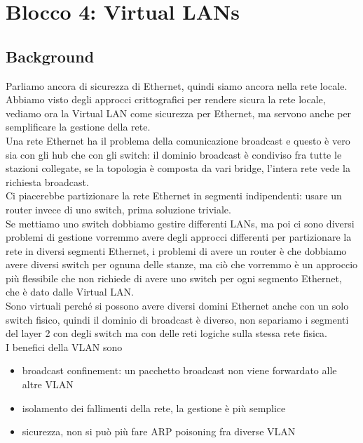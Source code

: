 \documentclass[12pt, oneside]{extbook} %
\begin{document}
\chapter*{Blocco 4: Virtual LANs}

\section{Background}
Parliamo ancora di sicurezza di Ethernet, quindi siamo ancora nella rete locale.
\\Abbiamo visto degli approcci crittografici per rendere sicura la rete locale, vediamo ora la Virtual LAN come sicurezza per Ethernet, ma servono anche per semplificare la gestione della rete.
\\Una rete Ethernet ha il problema della comunicazione broadcast e questo è vero sia con gli hub che con gli switch: il dominio broadcast è condiviso fra tutte le stazioni collegate, se la topologia è composta da vari bridge, l'intera rete vede la richiesta broadcast.
\\Ci piacerebbe partizionare la rete Ethernet in segmenti indipendenti: usare un router invece di uno switch, prima soluzione triviale.
\\Se mettiamo uno switch dobbiamo gestire differenti LANs, ma poi ci sono diversi problemi di gestione
vorremmo avere degli approcci differenti per partizionare la rete in diversi segmenti Ethernet, i problemi di avere un router è che dobbiamo avere diversi switch per ognuna delle stanze, ma ciò che vorremmo è un approccio più flessibile che non richiede di avere uno switch per ogni segmento Ethernet, che è dato dalle Virtual LAN.
\\Sono virtuali perché si possono avere diversi domini Ethernet anche con un solo switch fisico, quindi il dominio di broadcast è diverso, non separiamo i segmenti del layer 2 con degli switch ma con delle reti logiche sulla stessa rete fisica.
\\I benefici della VLAN sono
    \begin{itemize}
        \item broadcast confinement: un pacchetto broadcast non viene forwardato alle altre VLAN
        \item isolamento dei fallimenti della rete, la gestione è più semplice
        \item sicurezza, non si può più fare ARP poisoning fra diverse VLAN 
    \end{itemize}
\end{document}
